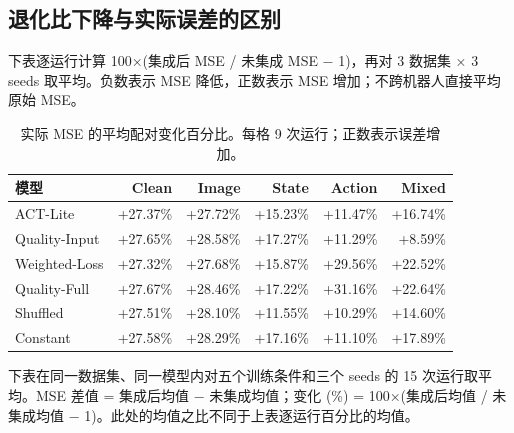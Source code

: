 \documentclass[11pt,a4paper,fontset=fandol]{ctexart}
\renewcommand{\arraystretch}{1.18}
\begin{document}
\clearpage\subsection{退化比下降与实际误差的区别}

\begingroup\small\renewcommand{\arraystretch}{1.08}\setlength{\intextsep}{8pt}
下表逐运行计算 100×(集成后 MSE / 未集成 MSE − 1)，再对 3 数据集 × 3 seeds 取平均。负数表示 MSE 降低，正数表示 MSE 增加；不跨机器人直接平均原始 MSE。
\begin{table}[H]\centering\small\begin{tabularx}{\linewidth}{Yrrrrr}\toprule
模型 & Clean & Image & State & Action & Mixed\\\midrule
ACT-Lite & +27.37\% & +27.72\% & +15.23\% & +11.47\% & +16.74\%\\
Quality-Input & +27.65\% & +28.58\% & +17.27\% & +11.29\% & +8.59\%\\
Weighted-Loss & +27.32\% & +27.68\% & +15.87\% & +29.56\% & +22.52\%\\
Quality-Full & +27.67\% & +28.46\% & +17.22\% & +31.16\% & +22.64\%\\
Shuffled & +27.51\% & +28.10\% & +11.55\% & +10.29\% & +14.60\%\\
Constant & +27.58\% & +28.29\% & +17.16\% & +11.10\% & +17.89\%\\
\bottomrule\end{tabularx}\caption{实际 MSE 的平均配对变化百分比。每格 9 次运行；正数表示误差增加。}\end{table}
下表在同一数据集、同一模型内对五个训练条件和三个 seeds 的 15 次运行取平均。MSE 差值 = 集成后均值 − 未集成均值；变化 (\%) = 100×(集成后均值 / 未集成均值 − 1)。此处的均值之比不同于上表逐运行百分比的均值。
\end{document}
